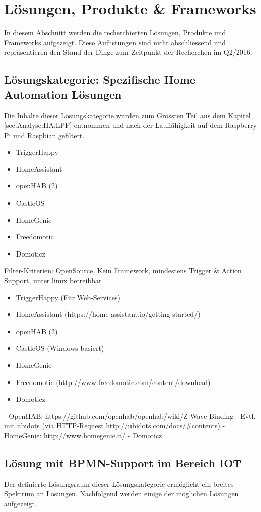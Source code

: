 \section{Lösungen, Produkte \& Frameworks }
In diesem Abschnitt werden die recherchierten Lösungen, Produkte und Frameworks aufgezeigt. Diese Auflistungen sind nicht abschliessend und repräsentieren den Stand der Dinge zum Zeitpunkt der Recherchen im Q2/2016.

\subsection{Lösungskategorie: Spezifische Home Automation Lösungen}
Die Inhalte dieser Lösungskategorie wurden zum Grössten Teil aus dem Kapitel \ref{sec:Analyse:HA:LPF}  entnommen und nach der Lauffähigkeit auf dem Raspberry Pi und Raspbian gefiltert.

\begin{itemize}
\item TriggerHappy
\item HomeAssistant
\item openHAB (2)
\item CastleOS
\item HomeGenie
\item Freedomotic
\item Domoticz
\end{itemize}

Filter-Kriterien: OpenSource, Kein Framework, mindestens Trigger \& Action Support, unter linux betreibbar
\begin{itemize}
\item TriggerHappy (Für Web-Services)
\item HomeAssistant (https://home-assistant.io/getting-started/)
\item openHAB (2)
\item CastleOS (Windows basiert)
\item HomeGenie
\item Freedomotic (http://www.freedomotic.com/content/download)
\item Domoticz
\end{itemize}

- OpenHAB: https://github.com/openhab/openhab/wiki/Z-Wave-Binding
- Evtl. mit ubidots (via HTTP-Request http://ubidots.com/docs/\#contents)
- HomeGenie: http://www.homegenie.it/
- Domoticz

\subsection{Lösung mit BPMN-Support im Bereich IOT}
Der definierte Lösungsraum dieser Lösungskategorie ermöglicht ein breites Spektrum an Lösungen. Nachfolgend werden einige der möglichen Lösungen aufgezeigt.

